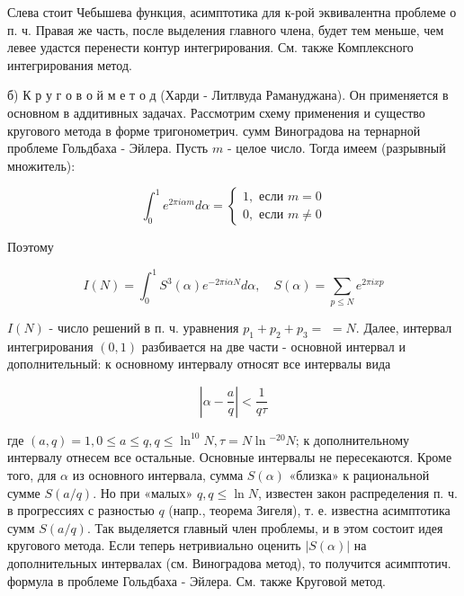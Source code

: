 \documentclass[10pt]{article}
\begin{document}
Слева стоит Чебышева функция, асимптотика для к-рой эквивалентна проблеме о п. ч. Правая же часть, после выделения главного члена, будет тем меньше, чем левее удастся перенести контур интегрирования. См. также Комплексного интегрирования метод.



б) К р у г о в о й м е т о д (Харди - Литлвуда Рамануджана). Он применяется в основном в аддитивных задачах. Рассмотрим схему применения и существо кругового метода в форме тригонометрич. сумм Виноградова на тернарной проблеме Гольдбаха - Эйлера. Пусть $m$ - целое число. Тогда имеем (разрывный множитель):



\[

\int_{0}^{1} e^{2 \pi i \alpha m} d \alpha=\left\{\begin{array}{l}

1, \text { если } m=0 \\

0, \text { если } m \neq 0

\end{array}\right.

\]



Поэтому



\[

I(N)=\int_{0}^{1} S^{3}(\alpha) e^{-2 \pi i \alpha N} d \alpha, \quad S(\alpha)=\sum_{p \leqslant N} e^{2 \pi i x p}

\]



$I(N)$ - число решений в п. ч. уравнения $p_{1}+p_{2}+p_{3}=$ $=N$. Далее, интервал интегрирования $(0,1)$ разбивается на две части - основной интервал и дополнительный: к основному интервалу относят все интервалы вида



\[

\left|\alpha-\frac{a}{q}\right|<\frac{1}{q \tau}

\]



где $(a, q)=1,0 \leqslant a \leqslant q, q \leqslant \ln ^{10} N, \tau=N \ln { }^{-20} N$; к дополнительному интервалу отнесем все остальные. Основные интервалы не пересекаются. Кроме того, для $\alpha$ из основного интервала, сумма $S(\alpha)$ «близка» к рациональной сумме $S(a / q)$. Но при «малых» $q, q \leqslant \ln N$, известен закон распределения п. ч. в прогрессиях с разностью $q$ (напр., теорема Зигеля), т. е. известна асимптотика сумм $S(a / q)$. Так выделяется главный член проблемы, и в этом состоит идея кругового метода. Если теперь нетривиально оценить $|S(\alpha)|$ на дополнительных интервалах (см. Виноградова метод), то получится асимптотич. формула в проблеме Гольдбаха - Эйлера. См. также Круговой метод.
\end{document}
